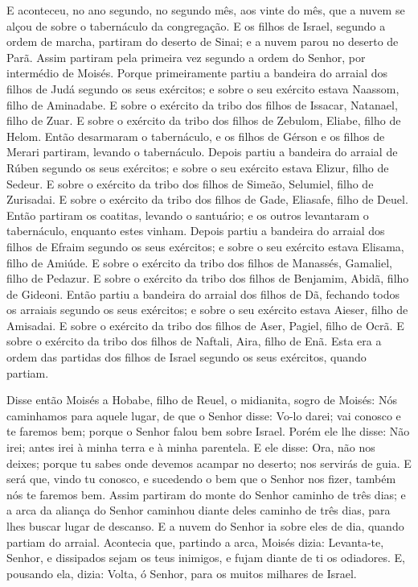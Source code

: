 E aconteceu, no ano segundo, no segundo mês, aos vinte do mês,
que a nuvem se alçou de sobre o tabernáculo da congregação. E
os filhos de Israel, segundo a ordem de marcha, partiram do deserto
de Sinai; e a nuvem parou no deserto de Parã. Assim partiram
pela primeira vez segundo a ordem do Senhor, por intermédio de
Moisés. Porque primeiramente partiu a bandeira do arraial dos
filhos de Judá segundo os seus exércitos; e sobre o seu exército
estava Naassom, filho de Aminadabe. E sobre o exército da
tribo dos filhos de Issacar, Natanael, filho de Zuar. E sobre
o exército da tribo dos filhos de Zebulom, Eliabe, filho de Helom.
Então desarmaram o tabernáculo, e os filhos de Gérson e os
filhos de Merari partiram, levando o tabernáculo. Depois
partiu a bandeira do arraial de Rúben segundo os seus exércitos; e
sobre o seu exército estava Elizur, filho de Sedeur. E sobre
o exército da tribo dos filhos de Simeão, Selumiel, filho de
Zurisadai. E sobre o exército da tribo dos filhos de Gade,
Eliasafe, filho de Deuel. Então partiram os coatitas, levando
o santuário; e os outros levantaram o tabernáculo, enquanto estes
vinham. Depois partiu a bandeira do arraial dos filhos de
Efraim segundo os seus exércitos; e sobre o seu exército estava
Elisama, filho de Amiúde. E sobre o exército da tribo dos
filhos de Manassés, Gamaliel, filho de Pedazur. E sobre o
exército da tribo dos filhos de Benjamim, Abidã, filho de Gideoni.
Então partiu a bandeira do arraial dos filhos de Dã, fechando
todos os arraiais segundo os seus exércitos; e sobre o seu exército
estava Aieser, filho de Amisadai. E sobre o exército da tribo
dos filhos de Aser, Pagiel, filho de Ocrã. E sobre o exército
da tribo dos filhos de Naftali, Aira, filho de Enã. Esta era
a ordem das partidas dos filhos de Israel segundo os seus exércitos,
quando partiam.

Disse então Moisés a Hobabe, filho de Reuel, o midianita, sogro
de Moisés: Nós caminhamos para aquele lugar, de que o Senhor disse:
Vo-lo darei; vai conosco e te faremos bem; porque o Senhor falou bem
sobre Israel. Porém ele lhe disse: Não irei; antes irei à
minha terra e à minha parentela. E ele disse: Ora, não nos
deixes; porque tu sabes onde devemos acampar no deserto; nos
servirás de guia. E será que, vindo tu conosco, e sucedendo o
bem que o Senhor nos fizer, também nós te faremos bem. Assim
partiram do monte do Senhor caminho de três dias; e a arca da
aliança do Senhor caminhou diante deles caminho de três dias, para
lhes buscar lugar de descanso. E a nuvem do Senhor ia sobre
eles de dia, quando partiam do arraial. Acontecia que,
partindo a arca, Moisés dizia: Levanta-te, Senhor, e dissipados
sejam os teus inimigos, e fujam diante de ti os odiadores. E,
pousando ela, dizia: Volta, ó Senhor, para os muitos milhares de
Israel.

